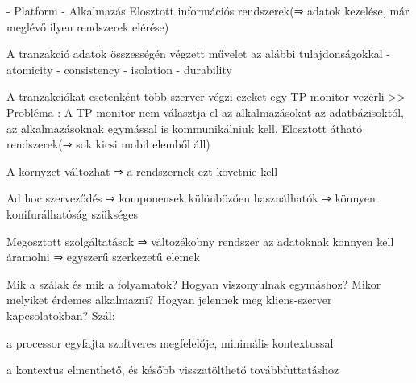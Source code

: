 \documentclass[12pt]{article}
\begin{document}
\begin{description}
                                                                        - Platform
                                                                        - Alkalmazás
                                                                        Elosztott információs rendszerek(⇒  adatok kezelése, már meglévő ilyen rendszerek elérése)
                                                                    \item A tranzakció adatok összességén végzett művelet az alábbi tulajdonságokkal
                                                                        - atomicity
                                                                        - consistency
                                                                        - isolation
                                                                        - durability
                                                                    \item A tranzakciókat esetenként több szerver végzi ezeket egy TP monitor vezérli 
                                                                        >> Probléma :  A TP monitor nem választja el az alkalmazásokat az adatbázisoktól,  az alkalmazásoknak egymással is kommunikálniuk kell.
                                                                        Elosztott átható rendszerek(⇒ sok kicsi mobil elemből áll)
                                                                    \item A környzet változhat ⇒ a rendszernek ezt követnie kell
                                                                    \item Ad hoc szerveződés ⇒ komponensek különbözően használhatók ⇒ könnyen konifurálhatóság szükséges
                                                                    \item Megosztott szolgáltatások ⇒ változékobny rendszer az adatoknak könnyen kell áramolni ⇒ egyszerű szerkezetű elemek
                                                                    \item  Mik a szálak és mik a folyamatok? Hogyan viszonyulnak egymáshoz? Mikor melyiket érdemes alkalmazni? Hogyan jelennek meg kliens-szerver kapcsolatokban?	
                                                                        Szál:
                                                                    \item a processor egyfajta szoftveres megfelelője, minimális kontextussal
                                                                    \item a kontextus elmenthető, és később visszatölthető továbbfuttatáshoz 

\end{description}
\end{document}

